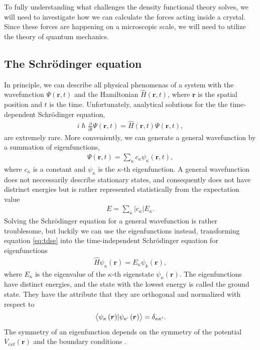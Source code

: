 To fully understanding what challenges the density functional theory solves, we will need to investigate how we can calculate the forces acting inside a crystal. Since these forces are happening on a microscopic scale, we will need to utilize the theory of quantum mechanics.


\subsection{The Schrödinger equation}

In principle, we can describe all physical phenomenas of a system with the wavefunction $\Psi(\boldsymbol{r},t)$ and the Hamiltonian $\hat{H}(\boldsymbol{r},t)$, where $\boldsymbol{r}$ is the spatial position and $t$ is the time. Unfortunately, analytical solutions for the the time-dependent Schrödinger equation,
\begin{align}
    i\hslash \frac{\partial}{\partial t} \Psi(\boldsymbol{r},t) = \hat{H}(\boldsymbol{r},t) \Psi(\boldsymbol{r},t),
    \label{eq:tdse}
\end{align}
are extremely rare. More conveniently, we can generate a general wavefunction by a summation of eigenfunctions,
\begin{align}
  \Psi(\boldsymbol{r},t) = \sum_\kappa c_\kappa \psi_\kappa(\boldsymbol{r},t),
\end{align}
where $c_\kappa$ is a constant and $\psi_\kappa$ is the $\kappa$-th eigenfunction. A general wavefunction does not neccessarily describe stationary states, and consequently does not have distrinct energies but is rather represented statistically from the expectation value
\begin{align}
  E = \sum_\kappa \lvert c_\kappa \rvert E_\kappa.
\end{align} Solving the Schrödinger equation for a general wavefunction is rather troublesome, but luckily we can use the eigenfunctions instead, transforming equation \autoref{eq:tdse} into the time-independent Schrödinger equation for eigenfunctions
\begin{align}
  \hat{H}\psi_\kappa(\boldsymbol{r}) = E_\kappa \psi_k(\boldsymbol{r}),
\end{align}
where $E_\kappa$ is the eigenvalue of the $\kappa$-th eigenstate $\psi_\kappa(\boldsymbol{r})$. The eigenfunctions have distinct energies, and the state with the lowest energy is called the ground state. They have the attribute that they are orthogonal and normalized with respect to
\begin{align}
  \left \langle \psi_\kappa \left(\boldsymbol{r}\right) \rvert \psi_{\kappa`} \left(\boldsymbol{r} \right) \right \rangle = \delta_{\kappa \kappa'}.
\end{align}
The symmetry of an eigenfunction depends on the symmetry of the potential $V_{ext}(\boldsymbol{r})$ and the boundary conditions \cite{Persson2020}.

